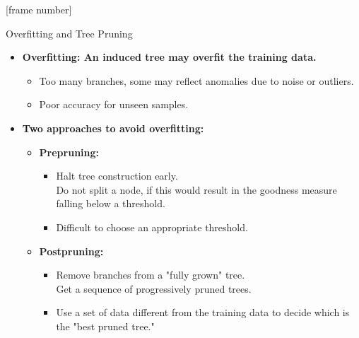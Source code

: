 \documentclass[aspectratio=169,t,table]{beamer}
\begin{document}
  {
    [frame number]
    \begin{frame}{Overfitting and Tree Pruning}
      \begin{itemize}
        \item \textbf{Overfitting: An induced tree may overfit the training data.}
        \begin{itemize}
          \item Too many branches, some may reflect anomalies due to noise or outliers.
          \item Poor accuracy for unseen samples.
        \end{itemize}
        \item \textbf{Two approaches to avoid overfitting:}
        \begin{itemize}
          \item \textbf{\color{airforceblue}Prepruning:}
          \begin{itemize}
            \item Halt tree construction early.\\
                  Do not split a node, if this would result in the goodness measure falling below a threshold.
            \item Difficult to choose an appropriate threshold.
          \end{itemize}
          \item \textbf{\color{airforceblue}Postpruning:}
          \begin{itemize}
            \item Remove branches from a "fully grown" tree.\\
                  Get a sequence of progressively pruned trees.
            \item Use a set of data different from the training data to decide which is the "best pruned tree."
          \end{itemize}
        \end{itemize}
      \end{itemize}
    \end{frame}
  }
\end{document}
